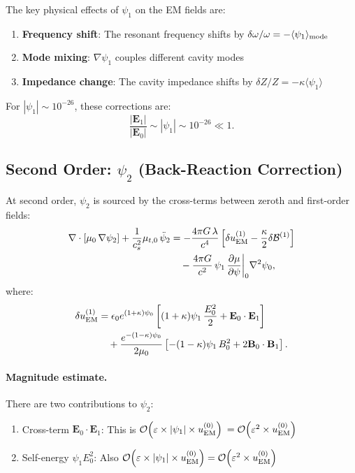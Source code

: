 \documentclass[aps,prd,twocolumn,superscriptaddress,floatfix,nofootinbib]{revtex4-2}
\newcommand{\mufunction}{\mu}
\newcommand{\lam}{\lambda}
\newcommand{\kap}{\kappa}
\newcommand{\calB}{\mathcal{B}}
\newcommand{\order}[1]{\mathcal{O}\!\left(#1\right)}
\begin{document}
The key physical effects of $\psi_1$ on the EM fields are:
\begin{enumerate}[nosep]
\item \textbf{Frequency shift}: The resonant frequency shifts by
$\delta\omega/\omega = -\langle\psi_1\rangle_{\rm mode}$
\item \textbf{Mode mixing}: $\nabla\psi_1$ couples different
cavity modes
\item \textbf{Impedance change}: The cavity impedance shifts by
$\delta Z/Z = -\kap\langle\psi_1\rangle$
\end{enumerate}

For $|\psi_1| \sim 10^{-26}$, these corrections are:
\begin{equation}
\frac{|\mathbf{E}_1|}{|\mathbf{E}_0|} \sim |\psi_1|
\sim 10^{-26} \ll 1.
\label{eq:E1-smallness}
\end{equation}

\subsection{Second Order: $\psi_2$ (Back-Reaction Correction)}
\label{sec:psi2}

At second order, $\psi_2$ is sourced by the cross-terms between
zeroth and first-order fields:
\begin{align}
\nabla\cdot[\mufunction_0\,\nabla\psi_2]
+ \frac{1}{c_s^2}\mufunction_{t,0}\,\ddot\psi_2
&= -\frac{4\pi G\,\lam}{c^4}\left[
\delta u_{\rm EM}^{(1)} - \frac{\kap}{2}\delta\calB^{(1)}\right]
\notag\\
&\quad - \frac{4\pi G}{c^2}\,\psi_1\,
\frac{\partial\mufunction}{\partial\psi}\bigg|_0
\nabla^2\psi_0,
\label{eq:psi2-equation}
\end{align}
where:
\begin{align}
\delta u_{\rm EM}^{(1)} &= \epsilon_0 e^{(1+\kap)\psi_0}
\left[(1+\kap)\psi_1\,\frac{E_0^2}{2}
+ \mathbf{E}_0\cdot\mathbf{E}_1\right] \notag\\
&\quad + \frac{e^{-(1-\kap)\psi_0}}{2\mu_0}
\left[-(1-\kap)\psi_1\,B_0^2 + 2\mathbf{B}_0\cdot\mathbf{B}_1\right].
\label{eq:delta-uEM}
\end{align}

\paragraph{Magnitude estimate.} There are two contributions to $\psi_2$:
\begin{enumerate}[nosep]
\item Cross-term $\mathbf{E}_0\cdot\mathbf{E}_1$: This is
$\order{\varepsilon \times |\psi_1| \times u_{\rm EM}^{(0)}}$
$= \order{\varepsilon^2 \times u_{\rm EM}^{(0)}}$
\item Self-energy $\psi_1 E_0^2$: Also $\order{\varepsilon \times |\psi_1|
\times u_{\rm EM}^{(0)}} = \order{\varepsilon^2 \times u_{\rm EM}^{(0)}}$
\end{enumerate}
\end{document}
